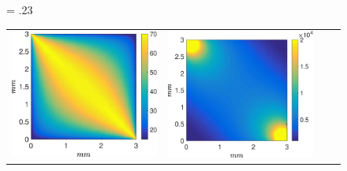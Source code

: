 \documentclass[final,5p,times,twocolumn]{elsarticle}
\begin{document}
\begin{figure}[h!tb]
	\centering
	\fwd = .23\textwidth
	\begin{tabular}{c c c c}
		\includegraphics[width=\fwd]{figs/E110_CBFOnDifferentResolutions_plot-Ps-scaleto-none-raw.eps} 
		& \includegraphics[width=\fwd]{figs/E110_CBFOnDifferentResolutions_plot-Pv-scaleto-none-raw.eps}

\end{tabular}
\end{figure}
\end{document}
